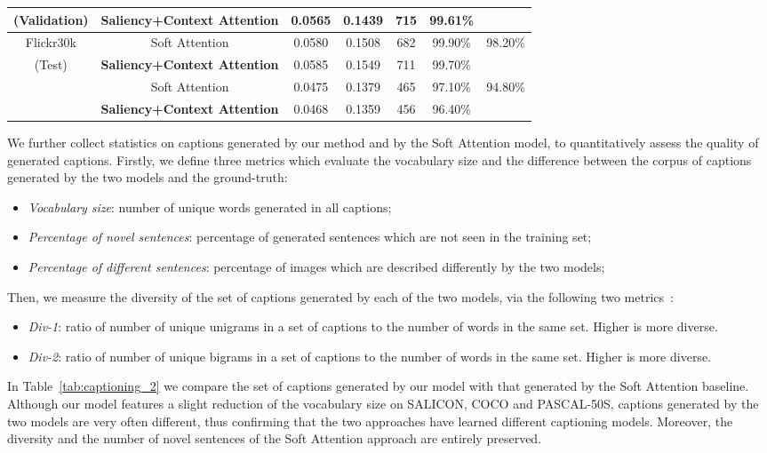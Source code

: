 \begin{table}[tb]
\begin{center}
\begin{small}
\begin{tabular}{|c|c|ccccc|}
    \footnotesize{(Validation)} & \footnotesize{\textbf{Saliency+Context Attention}}& 0.0565 & 0.1439 & 715  & 99.61\% & \\ \hline  
    \footnotesize{Flickr30k} & \footnotesize{Soft Attention} & 0.0580 & 0.1508 & 682 & 99.90\% & \multirow{2}{*}{98.20\%} \\
    \footnotesize{(Test)}  & \footnotesize{\textbf{Saliency+Context Attention}} & 0.0585 & 0.1549 & 711 & 99.70\% & \\ \hline  
    \footnotesize{\multirow{2}{*}{PASCAL-50S}} & \footnotesize{Soft Attention} & 0.0475 & 0.1379 & 465 & 97.10\% & \multirow{2}{*}{94.80\%} \\
    & \footnotesize{\textbf{Saliency+Context Attention}} & 0.0468 & 0.1359 & 456 & 96.40\% & \\ \hline
    \end{tabular}
    \end{small}
    \end{center}
\end{table}
We further collect statistics on captions generated by our method and by the Soft Attention model, to quantitatively assess the quality of generated captions. Firstly, we define three metrics which evaluate the vocabulary size and the difference between the corpus of captions generated by the two models and the ground-truth:
\begin{itemize}
\item \textit{Vocabulary size}: number of unique words generated in all captions;
\item \textit{Percentage of novel sentences}: percentage of generated sentences which are not seen in the training set;
\item \textit{Percentage of different sentences}: percentage of images which are described differently by the two models;
\end{itemize}
Then, we measure the diversity of the set of captions generated by each of the two models, via the following two metrics~\cite{shetty2017speaking}:
\begin{itemize}
\item \textit{Div-1}: ratio of number of unique unigrams in a set of captions to the number of words in the same set. Higher is more diverse.
\item \textit{Div-2}: ratio of number of unique bigrams in a set of captions to the number of words in the same set. Higher is more diverse.
\end{itemize}

In Table~\ref{tab:captioning_2} we compare the set of captions generated by our model with that generated by the Soft Attention baseline. Although our model features a slight reduction of the vocabulary size on SALICON, COCO and PASCAL-50S, captions generated by the two models are very often different, thus confirming that the two approaches have learned different captioning models. Moreover, the diversity and the number of novel sentences of the Soft Attention approach are entirely preserved.


